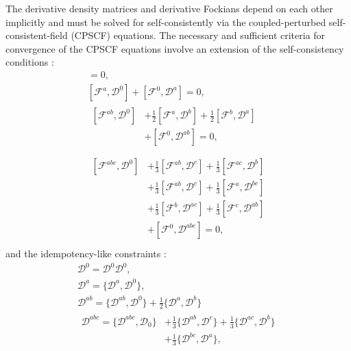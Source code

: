 \documentclass[prl,aps,twocolumn,showpacs,twocolumngrid,superbib]{revtex4}
\def\F{\mathcal{F}}
\def\D{\mathcal{D}}
\begin{document}
The derivative density matrices and derivative Fockians depend on 
each other implicitly and must be solved for self-consistently
via the coupled-perturbed self-consistent-field (CPSCF) equations.
The necessary and sufficient criteria for convergence of the 
CPSCF equations involve an extension of the self-consistency conditions \cite{Furche_2001}:
\begin{gather}
    [\F^{0} ,\D^{0}]=0,\label{eq:commutators1}\\
    [\F^{a} ,\D^{0}]+[\F^{0},\D^{a}]=0,\label{eq:commutators2}\\
  \begin{split}
    [\F^{ab},\D^{0}]&+\frac{1}{2}[\F^{a},\D^{b}]+\frac{1}{2}[\F^{b},\D^{a}] \\
    &+[\F^{0},\D^{ab}]=0,\label{eq:commutators3}\\
  \end{split}\\
  \begin{split}
    [\F^{abc},\D^{0}]&+\frac{1}{3}[\F^{ab},\D^{c}]+\frac{1}{3}[\F^{ac},\D^{b}]\\
    &+\frac{1}{3}[\F^{ab},\D^{c}]+\frac{1}{3}[\F^{a},\D^{bc}]\\
    &+\frac{1}{3}[\F^{b},\D^{ac}]+\frac{1}{3}[\F^{c},\D^{ab}]\\
    &+[\F^{0},\D^{abc}]=0,\label{eq:commutators4}\\
  \end{split}
\end{gather}
and the idempotency-like constraints \cite{Furche_2001}:
\begin{gather}
  \D^{0} =\D^{0} \D^{0},\label{eq:anticommutators1}\\
  \D^{a} =\{\D^{a},\D^{0}\},\label{eq:anticommutators2}\\
  \D^{ab}=\{\D^{ab},\D^{0}\}+\frac{1}{2}\{\D^{a},\D^{b}\}\label{eq:anticommutators3}\\
  \begin{split}
    \D^{abc}=\{\D^{abc},\D_0\}&+\frac{1}{3}\{\D^{ab},\D^{c}\}+\frac{1}{3}\{\D^{ac},\D^{b}\}\\
    &+\frac{1}{3}\{\D^{bc},\D^{a}\}\label{eq:anticommutators4},
  \end{split}
\end{gather}
\end{document}

